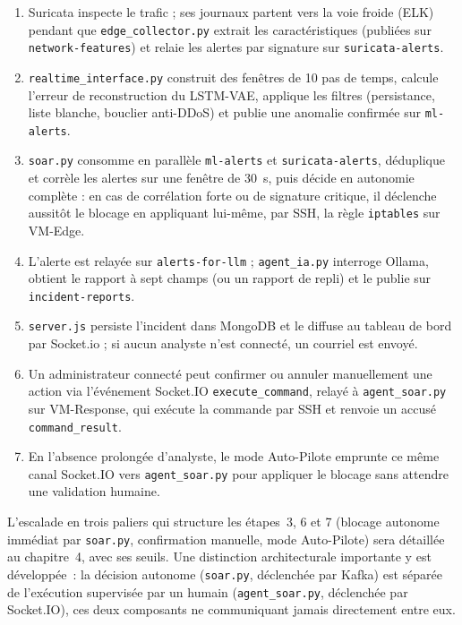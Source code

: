\begin{enumerate}
\item Suricata inspecte le trafic ; ses journaux partent vers la voie froide (ELK) pendant que \texttt{edge\_collector.py} extrait les caractéristiques (publiées sur \texttt{network-features}) et relaie les alertes par signature sur \texttt{suricata-alerts}.
\item \texttt{realtime\_interface.py} construit des fenêtres de 10 pas de temps, calcule l'erreur de reconstruction du LSTM-VAE, applique les filtres (persistance, liste blanche, bouclier anti-DDoS) et publie une anomalie confirmée sur \texttt{ml-alerts}.
\item \texttt{soar.py} consomme en parallèle \texttt{ml-alerts} et \texttt{suricata-alerts}, déduplique et corrèle les alertes sur une fenêtre de 30~s, puis décide en autonomie complète : en cas de corrélation forte ou de signature critique, il déclenche aussitôt le blocage en appliquant lui-même, par SSH, la règle \texttt{iptables} sur VM-Edge.
\item L'alerte est relayée sur \texttt{alerts-for-llm} ; \texttt{agent\_ia.py} interroge Ollama, obtient le rapport à sept champs (ou un rapport de repli) et le publie sur \texttt{incident-reports}.
\item \texttt{server.js} persiste l'incident dans MongoDB et le diffuse au tableau de bord par Socket.io ; si aucun analyste n'est connecté, un courriel est envoyé.
\item Un administrateur connecté peut confirmer ou annuler manuellement une action via l'événement Socket.IO \texttt{execute\_command}, relayé à \texttt{agent\_soar.py} sur VM-Response, qui exécute la commande par SSH et renvoie un accusé \texttt{command\_result}.
\item En l'absence prolongée d'analyste, le mode Auto-Pilote emprunte ce même canal Socket.IO vers \texttt{agent\_soar.py} pour appliquer le blocage sans attendre une validation humaine.
\end{enumerate}

L'escalade en trois paliers qui structure les étapes~3, 6 et 7 (blocage autonome immédiat par \texttt{soar.py}, confirmation manuelle, mode Auto-Pilote) sera détaillée au chapitre~4, avec ses seuils. Une distinction architecturale importante y est développée~: la décision autonome (\texttt{soar.py}, déclenchée par Kafka) est séparée de l'exécution supervisée par un humain (\texttt{agent\_soar.py}, déclenchée par Socket.IO), ces deux composants ne communiquant jamais directement entre eux.

